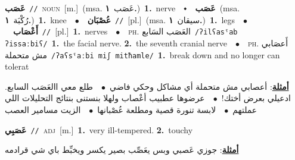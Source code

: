 \documentclass[10pt,a4paper,twoside]{article} %
\begin{document}
\begin{multicols}{2}
{\setlength\topsep{0pt}\textbf{\foreignlanguage{arabic}{عَصَب}}\ {\color{gray}\texttt{//}\color{black}}\ \textsc{noun}\ [m.]\ \color{gray}(msa. \foreignlanguage{arabic}{عَصَب}~\foreignlanguage{arabic}{\textbf{١.}})\color{black}\ \textbf{1.}~nerve\ \ $\smblkdiamond$\ \ \setlength\topsep{0pt}\textbf{\foreignlanguage{arabic}{عَصَب}}\ \color{gray}(msa. \foreignlanguage{arabic}{رُكْبَة}~\foreignlanguage{arabic}{\textbf{١.}})\color{black}\ \textbf{1.}~knee\ \ $\bullet$\ \ \setlength\topsep{0pt}\textbf{\foreignlanguage{arabic}{عُصْبَان}}\ {\color{gray}\texttt{//}\color{black}}\ [pl.]\ \color{gray}(msa. \foreignlanguage{arabic}{سيقان}~\foreignlanguage{arabic}{\textbf{١.}})\color{black}\ \textbf{1.}~legs\ \ $\bullet$\ \ \setlength\topsep{0pt}\textbf{\foreignlanguage{arabic}{أَعْصَاب}}\ {\color{gray}\texttt{//}\color{black}}\ [pl.]\ \textbf{1.}~nerves\ \ $\bullet$\ \ \textsc{ph.} \color{gray} \foreignlanguage{arabic}{العَصَب السَابع}\color{black}\ {\color{gray}\texttt{/{\sffamily ʔilʕasˤab ʔissaːbiʕ}/}\color{black}}\ \textbf{1.}~the facial nerve.  \textbf{2.}~the seventh cranial nerve\ \ $\bullet$\ \ \textsc{ph.} \color{gray} \foreignlanguage{arabic}{أَعصَابي مش متحملة}\color{black}\ {\color{gray}\texttt{/{\sffamily ʔaʕsˤaːbi miʃ mitħamle}/}\color{black}}\ \textbf{1.}~break down and no longer can tolerat\  \begin{flushright}\color{gray}\foreignlanguage{arabic}{\textbf{\underline{\foreignlanguage{arabic}{أمثلة}}}: أعصابي مش متحملة أي مشاكل وحكي فاضي\ $\bullet$\ \  طلع معي االعَصَب السابع. ادعيلي بعرض أختك!\ $\bullet$\ \  عرضوها عطبيب أعْصاب ولهلا بنستنى بنتائج التحليلات اللي عملتهم\ $\bullet$\ \  لابسة تنورة قصية ومطلعة عُصْبانها\ $\bullet$\ \  الزيت مسامير العصب}\end{flushright}\color{black}} \vspace{2mm}

{\setlength\topsep{0pt}\textbf{\foreignlanguage{arabic}{عَصَبِي}}\ {\color{gray}\texttt{//}\color{black}}\ \textsc{adj}\ [m.]\ \textbf{1.}~very ill-tempered.  \textbf{2.}~touchy\  \begin{flushright}\color{gray}\foreignlanguage{arabic}{\textbf{\underline{\foreignlanguage{arabic}{أمثلة}}}: جوزي عَصبي وبس يعَصِّب بصير يكسر ويخبِّط باي شي قرادمه}\end{flushright}\color{black}} \vspace{2mm}


\end{multicols}
\end{document}
